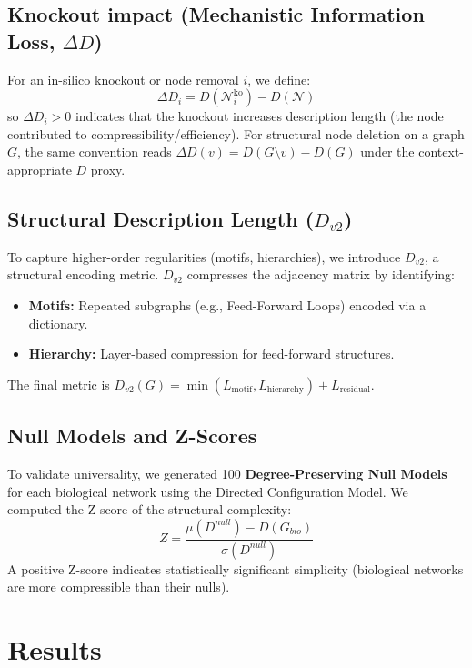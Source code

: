 \documentclass{article}
\begin{document}
\subsection{Knockout impact (Mechanistic Information Loss, $\Delta D$)}
For an in-silico knockout or node removal $i$, we define:
\begin{equation}
\Delta D_i = D(\mathcal{N}_i^{\mathrm{ko}}) - D(\mathcal{N})
\end{equation}
so $\Delta D_i>0$ indicates that the knockout increases description length (the node contributed to compressibility/efficiency). For structural node deletion on a graph $G$, the same convention reads $\Delta D(v)=D(G\setminus v)-D(G)$ under the context-appropriate $D$ proxy.

\subsection{Structural Description Length ($D_{v2}$)}
To capture higher-order regularities (motifs, hierarchies), we introduce $D_{v2}$, a structural encoding metric. $D_{v2}$ compresses the adjacency matrix by identifying:
\begin{itemize}
    \item \textbf{Motifs:} Repeated subgraphs (e.g., Feed-Forward Loops) encoded via a dictionary.
    \item \textbf{Hierarchy:} Layer-based compression for feed-forward structures.
\end{itemize}
The final metric is $D_{v2}(G) = \min(L_{\mathrm{motif}}, L_{\mathrm{hierarchy}}) + L_{\mathrm{residual}}$.

\subsection{Null Models and Z-Scores}
To validate universality, we generated 100 \textbf{Degree-Preserving Null Models} for each biological network using the Directed Configuration Model. We computed the Z-score of the structural complexity:
\begin{equation}
Z = \frac{\mu(D^{null}) - D(G_{bio})}{\sigma(D^{null})}
\end{equation}
A positive Z-score indicates statistically significant simplicity (biological networks are more compressible than their nulls).

\section{Results}
\end{document}
